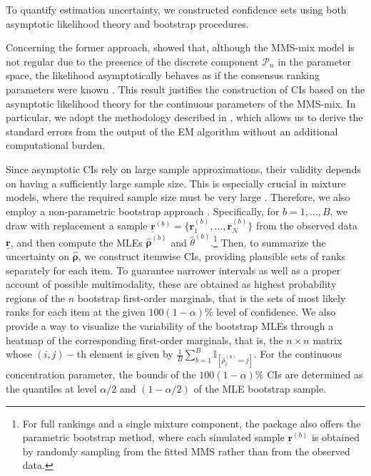 To quantify estimation uncertainty, we constructed confidence sets using both asymptotic likelihood theory and bootstrap procedures. 

Concerning the former approach, \cite{critchlow85metric} showed that, although the MMS-mix model is not regular due to the presence of the discrete component $\mathcal{P}_n$ in the parameter space, the likelihood asymptotically behaves as if the consensus ranking parameters were known \citep{Marden1995}. This result justifies the construction of CIs based on the asymptotic likelihood theory 
for the continuous parameters of the MMS-mix. In particular, we adopt the methodology described in \citet{mclachan2000}, which 
allows us to derive the standard errors from the output of the EM algorithm without an additional computational burden. 

Since asymptotic CIs rely on large sample approximations, their validity depends on having a sufficiently large sample size. This is especially crucial in mixture models, where the required sample size must be very large \citep{mclachan2000}. Therefore, we also employ a non-parametric bootstrap approach \citep{efron82boot}.
Specifically, for $b=1,\dots,B$, we draw with replacement a sample $\underline{\bm r}^{(b)} =\{\bm r_1^{(b)},\dots,\bm r_N^{(b)}\}$ from the observed data $\underline{\bm r}$, and then compute the MLEs $\hat{\bm\rho}^{(b)}$ and $\hat{\theta}^{(b)}$.\footnote{
 For full rankings and a single mixture component, the  package also offers the parametric bootstrap method, where each simulated sample $\underline{\bm r}^{(b)}$ is obtained by randomly sampling from the fitted MMS rather than from the observed data.} 
Then, to summarize the uncertainty on $\hat{\bm\rho}$, we construct itemwise CIs, providing plausible sets of ranks separately for each item. To guarantee narrower intervals as well as a proper account of possible multimodality, these are obtained as highest probability regions of the $n$ bootstrap first-order marginals, that is the sets of most likely ranks for each item at the given $100(1-\alpha)\%$ level of confidence.
We also provide a way to visualize the variability of the bootstrap MLEs through a heatmap of the corresponding first-order marginals, that is, the $n\times n$ matrix whose $(i,j)-$th element is given by $\frac{1}{B}\sum_{b=1}^{B} \mathbb{I}_{[\hat{\rho}^{(b)}_i=j]}$. For the continuous concentration parameter, the bounds of the $100(1-\alpha)\%$ CIs are determined as the quantiles at level $\alpha/2$ and $(1 - \alpha/2)$ of the MLE bootstrap sample.

